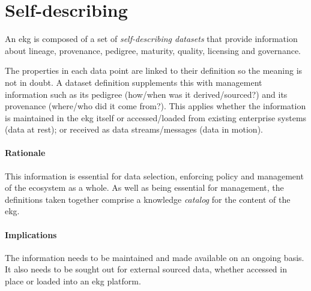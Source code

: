 \section{Self-describing}\label{sec:ekg-principle-self-describing}

An \gls{ekg} is composed of a set of \textit{self-describing datasets} that provide information about 
lineage, provenance, pedigree, maturity, quality, licensing and governance.

The properties in each data point are linked to their definition so the meaning is not in doubt. 
A \gls{dataset} definition supplements this with management information such as its pedigree (how/when 
was it derived/sourced?) and its provenance (where/who did it come from?). 
This applies whether the information is maintained in the \gls{ekg} itself or accessed/loaded 
from existing enterprise systems (data at rest); or received as data streams/messages (data in motion).

\paragraph{Rationale}

This information is essential for data selection, enforcing policy and management of the ecosystem as a whole.
As well as being essential for management, the definitions taken together comprise a 
knowledge \textit{catalog} for the content of the \gls{ekg}.

\paragraph{Implications}

The information needs to be maintained and made available on an ongoing basis.
It also needs to be sought out for external sourced data, whether accessed in place or loaded into an \gls{ekg} platform.
